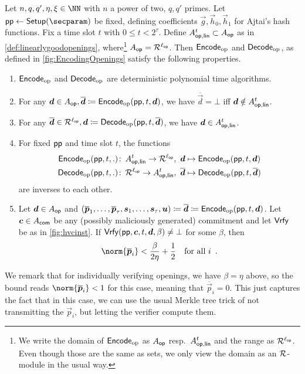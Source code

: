 \begin{theorem}\label{thm:EncodingOfOpenings}
Let $n,q,q',\eta,\xi\in\NN$ with $n$ a power of two, $q,q'$ primes.
Let $\params\gets\setup(\secparam)$ be fixed, defining coefficients $\vec{g},\vec{h}_0,\vec{h}_1$ for Ajtai's hash functions.
Fix a time slot $t$ with $0\leq t < 2^\tau$.
Define $A_{\mathsf{op,lin}}^{t}\subset A_{\mathsf{op}}$ as in \autoref{def:linearlygoodopenings}, where\footnote{We write the domain of $\mathsf{Encode}_{\mathrm{op}}$ as $A_{\mathsf{op}}$ resp.\ $A_{\mathsf{op,lin}}^{t}$ and the range as $\mathcal{R}^{\ell_{\mathsf{op}}}$. Even though those are the same as sets, we only view the domain as an $\mathcal{R}$-module in the usual way.} $A_{\mathsf{op}} = \mathcal{R}^{\ell_{\mathsf{op}}}$.
Then $\mathsf{Encode}_{\mathrm{op}}$ and $\mathsf{Decode}_{\mathrm{op}}$, as defined in \autoref{fig:EncodingOpenings} satisfy the following properties.
\begin{enumerate}
 \item $\mathsf{Encode}_{\mathrm{op}}$ and $\mathsf{Decode}_{\mathrm{op}}$ are deterministic polynomial time algorithms. \label{item:openencodeispt}
 \item For any $\boldsymbol{d}\in A_{\mathsf{op}},\overline{\boldsymbol{d}} \coloneqq \mathsf{Encode}_{\mathrm{op}}(\mathsf{pp},t, \boldsymbol{d})$, we have $\overline{\vec{d}} = \bot$ iff $\boldsymbol{d}\notin A_{\mathsf{op,lin}}^{t}$.\label{item:openencodeworks}
 \item For any $\overline{\boldsymbol{d}}\in\mathcal{R}^{\ell_{\mathsf{op}}}, \boldsymbol{d}\coloneqq \mathsf{Decode}_{\mathrm{op}}(\mathsf{pp},t, \overline{\boldsymbol{d}})$, we have $\boldsymbol{d}\in A_{\mathsf{op,lin}}^{t}$. \label{item:opendecodeworks}
 \item For fixed $\mathsf{pp}$ and time slot $t$, the functions 
 \begin{align*}
 \openencode(\params, t, .)\colon\,\modlinear{t} \to \ring^\oplen&,\ \vec{d}\mapsto \openencode(\params,t, \vec{d})\\
 \opendecode(\params, t, .)\colon\,\ring^\oplen \to \modlinear{t}&,\ \overline{\vec{d}}\mapsto \opendecode(\params,t, \overline{\vec{d}})
 \end{align*}
are inverses to each other.\label{item:openencodeinverse}
\item Let $\boldsymbol{d}\in A_{\mathsf{op}}$ and $(\overline{\boldsymbol{p}}_1,\ldots,\overline{\boldsymbol{p}}_\tau,\boldsymbol{s}_1,\ldots,\boldsymbol{s}_\tau,\boldsymbol{u}) \coloneqq \overline{\boldsymbol{d}}\coloneqq \mathsf{Encode}_{\mathrm{op}}(\mathsf{pp},t, \boldsymbol{d})$. Let $\boldsymbol{c}\in A_{\mathsf{com}}$ be any (possibly maliciously generated) commitment and let $\mathsf{Vrfy}$ be as in \autoref{fig:hvcinst}. If $\mathsf{Vrfy}(\mathsf{pp}, \boldsymbol{c}, t,\boldsymbol{d}, \beta) \neq \bot$ for some $\beta$, then \label{item:openencodebounds}
\[
 \norm{\overline{\vec{p}}_i} < \frac{\beta}{2\eta} + \frac12\quad\text{for all $i$}\enspace.
\]
\end{enumerate}
We remark that for individually verifying openings, we have $\beta=\eta$ above, so the bound reads $\norm{\overline{\vec{p}}_i} < 1$ for this case, meaning that $\overline{\vec{p}}_i = 0$.
This just captures the fact that in this case, we can use the usual Merkle tree trick of not transmitting the $\vec{p}_i$, but letting the verifier compute them.
\end{theorem}
